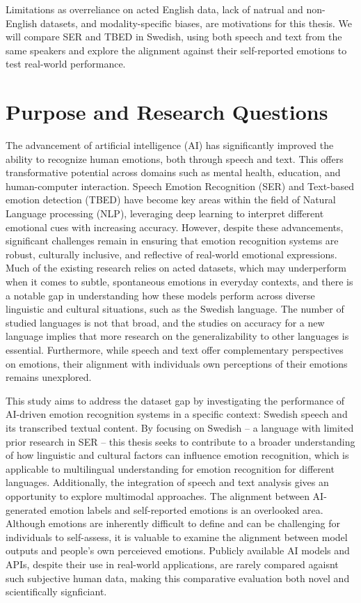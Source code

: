 Limitations as overreliance on acted English data, lack of natrual and non-English datasets, and modality-specific biases, are motivations for this thesis. We will compare SER and TBED in Swedish, using both speech and text from the same speakers and explore the alignment against their self-reported emotions to test real-world performance. 

\newpage
\section{Purpose and Research Questions}

The advancement of artificial intelligence (AI) has significantly improved the ability to recognize human emotions, both through speech and text. This offers transformative potential across domains such as mental health, education, and human-computer interaction. Speech Emotion Recognition (SER) and Text-based emotion detection (TBED) have become key areas within the field of Natural Language processing (NLP), leveraging deep learning to interpret different emotional cues with increasing accuracy. However, despite these advancements, significant challenges remain in ensuring that emotion recognition systems are robust, culturally inclusive, and reflective of real-world emotional expressions. Much of the existing research relies on acted datasets, which may underperform when it comes to subtle, spontaneous emotions in everyday contexts, and there is a notable gap in understanding how these models perform across diverse linguistic and cultural situations, such as the Swedish language. The number of studied languages is not that broad, and the studies on accuracy for a new language implies that more research on the generalizability to other languages is essential. Furthermore, while speech and text offer complementary perspectives on emotions, their alignment with individuals own perceptions of their emotions remains unexplored. 

This study aims to address the dataset gap by investigating the performance of AI-driven emotion recognition systems in a specific context: Swedish speech and its transcribed textual content. By focusing on Swedish – a language with limited prior research in SER – this thesis seeks to contribute to a broader understanding of how linguistic and cultural factors can influence emotion recognition, which is applicable to multilingual understanding for emotion recognition for different languages. Additionally, the integration of speech and text analysis gives an opportunity to explore multimodal approaches. The alignment between AI-generated emotion labels and self-reported emotions is an overlooked area. 
Although emotions are inherently difficult to define and can be challenging for individuals to self-assess, it is valuable to examine the alignment between model outputs and people’s own perceieved emotions. Publicly available AI models and APIs, despite their use in real-world applications, are rarely compared agaisnt such subjective human data, making this comparative evaluation both novel and scientifically signficiant. 

